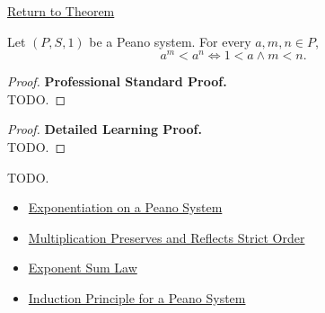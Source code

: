 \newpage
{}
\label{prf:powers-with-common-base-preserve-strict-order}

\begin{remark*}[Return]
\hyperref[thm:powers-with-common-base-preserve-strict-order]{Return to Theorem}
\end{remark*}

\begin{theorem*}
Let $(P,S,1)$ be a Peano system. For every $a,m,n \in P$,
\[
a^m<a^n
\Longleftrightarrow
1<a \land m<n.
\]
\end{theorem*}

\begin{proof}
\textbf{Professional Standard Proof.}~\\
TODO.
\end{proof}

\begin{proof}
\textbf{Detailed Learning Proof.}~\\
TODO.
\end{proof}

\begin{remark*}
TODO.
\end{remark*}

\begin{dependencies}
\begin{itemize}
  \item \hyperref[def:exponentiation-on-peano-system]{Exponentiation on a Peano System}
  \item \hyperref[thm:multiplication-preserves-and-reflects-strict-order]{Multiplication Preserves and Reflects Strict Order}
  \item \hyperref[thm:exponent-sum-law]{Exponent Sum Law}
  \item \hyperref[thm:induction-principle-for-peano-system]{Induction Principle for a Peano System}
\end{itemize}
\end{dependencies}
